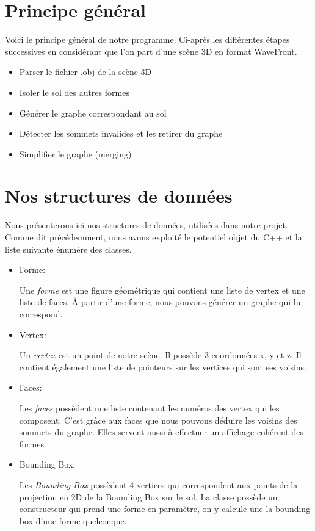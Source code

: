 \documentclass[a4paper,12pt]{report}
\begin{document}
\section{Principe général}

Voici le principe général de notre programme. Ci-après les différentes étapes successives en considérant que l'on part d'une scène 3D en format WaveFront.

\begin{itemize}
 \item Parser le fichier .obj de la scène 3D
 \item Isoler le sol des autres formes
 \item Générer le graphe correspondant au sol
 \item Détecter les sommets invalides et les retirer du graphe
 \item Simplifier le graphe (merging)
\end{itemize}

\section{Nos structures de données}

Nous présenterons ici nos structures de données, utilisées dans notre projet. Comme dit précédemment, nous avons exploité le potentiel objet du C++ et la liste suivante énumère des classes.

\begin{itemize}
 \item Forme:

Une \textit{forme} est une figure géométrique qui contient une liste de vertex et une liste de faces. À partir d'une forme, nous pouvons générer un graphe qui lui correspond.
 
 \item Vertex:

Un \textit{vertex} est un point de notre scène. Il possède 3 coordonnées x, y et z. Il contient également une liste de pointeurs sur les vertices qui sont ses voisins.

 \item Faces:

Les \textit{faces} possèdent une liste contenant les numéros des vertex qui les composent. C'est grâce aux faces que nous pouvons déduire les voisins des sommets du graphe. Elles servent aussi à effectuer un affichage cohérent des formes.

 \item Bounding Box:

Les \textit{Bounding Box} possèdent 4 vertices qui correspondent aux points de la projection en 2D de la Bounding Box sur le sol. La classe possède un constructeur qui prend une forme en paramètre, on y calcule une la bounding box d'une forme quelconque.

\end{itemize}
\end{document}
